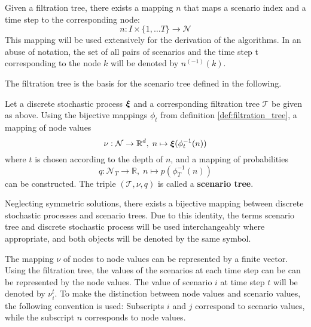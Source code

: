 \begin{remark}
  Given a filtration tree, there exists a mapping $n$ that maps a scenario index and a time step to the corresponding node:
  \begin{equation}
    \label{eq:71}
    n:I\times \{1,\ldots T\}\rightarrow\mathcal{N}
  \end{equation}
  This mapping will be used extensively for the derivation of the algorithms.
  In an abuse of notation, the set of all pairs of scenarios and the time step t corresponding to the node $k$ will be denoted by $n^{(-1)}(k)$.
\end{remark}
The filtration tree is the basis for the scenario tree defined in the following.
\begin{definition}
  Let a discrete stochastic process $\boldsymbol\xi$ and a corresponding filtration tree $\mathcal{T}$ be given as above.
  Using the bijective mappings $\phi_t$ from definition \ref{def:filtration_tree}, a mapping of node values
  \[
  \nu:\mathcal{N}\rightarrow\mathbb{R}^d,\; n\mapsto \boldsymbol\xi(\phi_t^{-1}(n))
  \]
  where $t$ is chosen according to the depth of $n$,
  and a mapping of probabilities
  \[
  q:\mathcal{N}_T\rightarrow\mathbb{R},\; n\mapsto p(\phi_T^{-1}(n))
  \]
  can be constructed.
  The triple $(\mathcal{T}, \nu, q)$ is called a \textbf{scenario tree}.
\end{definition}
Neglecting symmetric solutions, there exists a bijective mapping between discrete stochastic processes and scenario trees.
Due to this identity, the terms scenario tree and discrete stochastic process will be used interchangeably where appropriate, and both objects will be denoted by the same symbol.
\begin{remark}
The mapping $\nu$ of nodes to node values can be represented by a finite vector.
Using the filtration tree, the values of the scenarios at each time step can be can be represented by the node values.
The value of scenario $i$ at time step $t$ will be denoted by $\nu_i^t$. To make the distinction between node values and scenario values, the following convention is used: Subscripts $i$ and $j$ correspond to scenario values, while the subscript $n$ corresponds to node values.
\end{remark}

